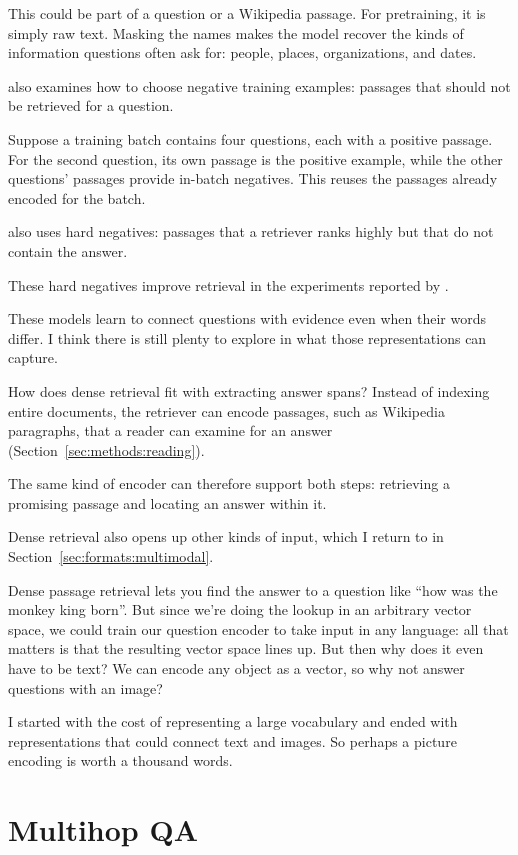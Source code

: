 This could be part of a \quizbowl{} question or a Wikipedia passage.  For pretraining, it is simply raw text.  Masking the names makes the model recover the kinds of information questions often ask for: people, places, organizations, and dates.

 also examines how to choose negative training examples: passages that should not be retrieved for a question.

Suppose a training batch contains four questions, each with a positive passage.  For the second question, its own passage is the positive example, while the other questions' passages provide in-batch negatives.  This reuses the passages already encoded for the batch.

 also uses hard negatives: passages that a  retriever ranks highly but that do not contain the answer.

These hard negatives improve retrieval in the experiments reported by \citet{karpukhin-20}.

These models learn to connect questions with evidence even when their words differ.  I think there is still plenty to explore in what those representations can capture.

How does dense retrieval fit with extracting answer spans?  Instead of indexing entire documents, the retriever can encode passages, such as Wikipedia paragraphs, that a reader can examine for an answer (Section~\ref{sec:methods:reading}).

The same kind of encoder can therefore support both steps: retrieving a promising passage and locating an answer within it.

Dense retrieval also opens up other kinds of input, which I return to in Section~\ref{sec:formats:multimodal}.

Dense passage retrieval lets you find the answer to a question like ``how was the monkey king born''.  But since we're doing the lookup in an arbitrary vector space, we could train our question encoder to take input in any language: all that matters is that the resulting vector space lines up.  But then why does it even have to be text?  We can encode any object as a vector, so why not answer questions with an image?

I started with the cost of representing a large vocabulary and ended with representations that could connect text and images.  So perhaps a picture encoding is worth a thousand words.

\section{Multihop QA}
\label{sec:formats:multihop}

